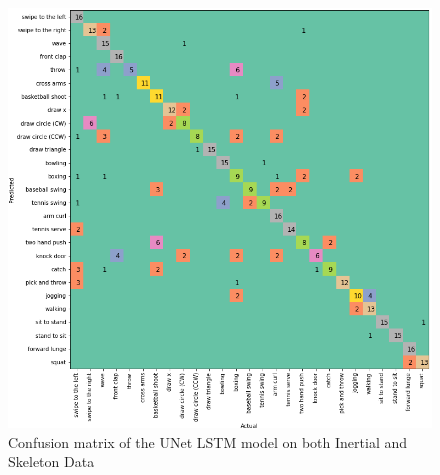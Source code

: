 \documentclass[conference]{IEEEtran}
\begin{document}
\begin{figure}[H]
\begin{center}
\includegraphics[scale=0.3]{UNet_LSTM_iner_skel/UNet_lstm_confusion_matrix_iner_skel.png}
\end{center}
\caption{\label{fig:confusion_matrix_UNet_LSTM_iner_skel} 
Confusion matrix of the UNet LSTM model on both Inertial and Skeleton Data}
\end{figure}
\end{document}
